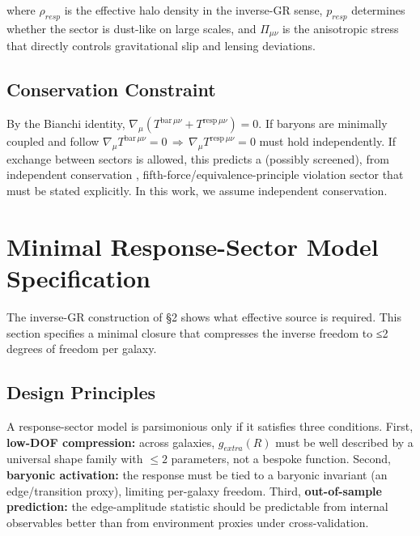 \documentclass[11pt]{article}
\begin{document}
where \(\rho_{resp}\) is the effective halo density in the inverse-GR sense, \(p_{resp}\) determines whether the sector is dust-like on large scales, and \(\Pi_{\mu\nu}\) is the anisotropic stress that directly controls gravitational slip and lensing deviations.

\subsection{Conservation Constraint}\label{conservation-constraint}

By the Bianchi identity, \(\nabla_{\mu}\left( T^{\text{bar}\,\mu\nu} + T^{\text{resp}\,\mu\nu} \right) = 0\). If baryons are minimally coupled and follow \(\nabla_{\mu}T^{\text{bar}\,\mu\nu} = 0\, \Rightarrow \,\nabla_{\mu}T^{\text{resp}\,\mu\nu} = 0\) must hold independently. If exchange between sectors is allowed, this predicts a (possibly screened), from independent conservation \citep{PoissonWill2014, Wald1984GR}, fifth-force/equivalence-principle violation sector that must be stated explicitly. In this work, we assume independent conservation.


\section{Minimal Response-Sector Model Specification}\label{minimal-response-sector-model-specification}

The inverse-GR construction of §2 shows what effective source is required. This section specifies a minimal closure that compresses the inverse freedom to ≤2 degrees of freedom per galaxy.

\subsection{Design Principles}\label{design-principles}

A response-sector model is parsimonious only if it satisfies three conditions. First, \textbf{low-DOF compression:} across galaxies, \(g_{extra}(R)\) must be well described by a universal shape family with \(\leq 2\) parameters, not a bespoke function. Second, \textbf{baryonic activation:} the response must be tied to a baryonic invariant (an edge/transition proxy), limiting per-galaxy freedom. Third, \textbf{out-of-sample prediction:} the edge-amplitude statistic should be predictable from internal observables better than from environment proxies under cross-validation.
\end{document}
